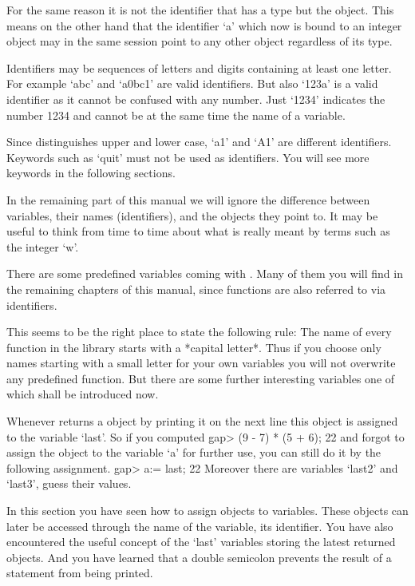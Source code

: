 For the  same reason it is  not the  identifier that has   a type but the
object.  This means  on the other hand that  the identifier `a' which now
is bound to an integer object may in the  same session point to any other
object regardless of its type.

Identifiers  may be sequences  of letters and digits containing at  least
one letter.   For example  `abc' and `a0bc1'  are valid identifiers.  But
also `123a'  is  a valid identifier as  it cannot be  confused  with  any
number.  Just `1234' indicates the  number 1234 and cannot be at the same
time the name of a variable.

Since  {\GAP} distinguishes  upper and  lower  case, `a1'  and  `A1'  are
different  identifiers.   Keywords  such as `quit'  must not  be used  as
identifiers.  You will see more keywords in the following sections.

In  the remaining  part of  this manual   we  will ignore the  difference
between variables, their names  (identifiers), and the objects they point
to.  It may be useful  to think from time  to  time about what is  really
meant by terms such as the integer `w'.

There are some predefined variables coming with {\GAP}.  Many of them you
will find in the remaining  chapters of  this manual, since functions are
also referred to via identifiers.

This seems to be the  right place to state the  following rule:  The name
of  every function in the {\GAP}  library starts with a *capital letter*.
Thus if you choose  only names starting with a  small letter for your own
variables you will  not overwrite any predefined  function. But there are
some further interesting variables one of which shall be introduced now.

Whenever {\GAP} returns a  object by printing it  on  the next  line this
object is assigned to the variable `last'.  So if you computed
\beginexample
    gap> (9 - 7) * (5 + 6);
    22 
\endexample
and forgot to assign the object to the  variable `a' for further use, you
can still do it by the following assignment.
\beginexample
    gap> a:= last;
    22 
\endexample
Moreover there are variables `last2' and `last3', guess their values.

In this section you  have seen how to  assign objects to variables. These
objects  can  later be accessed  through the  name  of the  variable, its
identifier. You  have also encountered the  useful concept of  the `last'
variables storing the latest returned  objects. And you have learned that
a double semicolon prevents the result of a statement from being printed.

